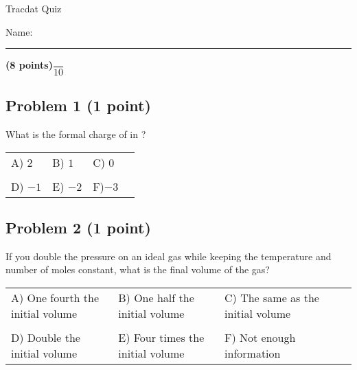 \documentclass[12pt, letterpaper]{memoir}
\begin{document}
	\begin{center}
		{\large Tracdat Quiz}
	\end{center}
	{\large Name: \rule[-1mm]{4in}{.1pt} {\bfseries (8 points)}\hspace{4em}$\dfrac{~}{10}$} 
	
	\subsection*{Problem 1 (1 point)}
	What is the formal charge of  in ? \\
	
	\begin{tabular}{llll}
		A) $2$ & B) $1$ & C) $0$\\ \\
		D) $-1$ & E) $-2$ & F)$-3$
	\end{tabular}	
	
	\vspace{10em}
	\subsection*{Problem 2 (1 point)}
	If you double the pressure on an ideal gas while keeping the temperature and number of moles constant, what is the final volume of the gas? \\
	
	\noindent
	\begin{tabular}{llll}
		A) One fourth the initial volume & B) One half the initial volume & C) The same as the initial volume\\ \\
		D) Double the initial volume & E) Four times the initial volume & F) Not enough information
	\end{tabular}		
\end{document}
